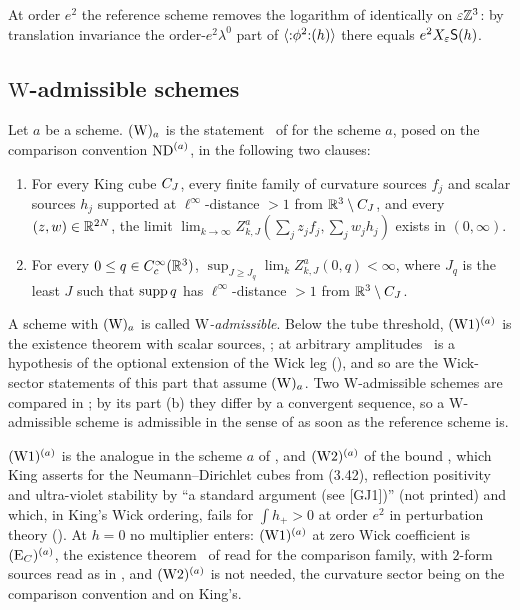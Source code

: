 At order $e^2$ the reference scheme removes the logarithm of  identically on $\varepsilon\mathbb Z^3$: by translation invariance the order-$e^2\lambda^0$ part of $\langle{:}\phi^2{:}(h)\rangle$ there equals $e^2X_{\varepsilon}\mathsf S(h)$.

\subsection{$\mathrm W$-admissible schemes}

\begin{definition}\label{rot:hyp:adm}
Let $a$ be a scheme. $(\mathrm W)_{a}$ is the statement \Wtwo\ of  for the scheme $a$, posed on the comparison convention $\mathrm{ND}^{(a)}$, in the following two clauses:
\begin{enumerate}[leftmargin=*]
\item[$\Wone^{(a)}$] For every King cube $C_J$, every finite family of curvature sources $f_j$ and scalar sources $h_j$ supported at $\ell^\infty$-distance $>1$ from $\mathbb R^3\setminus C_J$, and every $(z,w)\in\mathbb R^{2N}$, the limit $\lim_{k\to\infty}Z^a_{k,J}(\sum_jz_jf_j,\sum_jw_jh_j)$ exists in $(0,\infty)$.
\item[$\Wtwo^{(a)}$] For every $0\le q\in C^\infty_c(\mathbb R^3)$, $\sup_{J\ge J_q}\lim_kZ^a_{k,J}(0,q)<\infty$, where $J_q$ is the least $J$ such that $\operatorname{supp} q$ has $\ell^\infty$-distance $>1$ from $\mathbb R^3\setminus C_J$.
\end{enumerate}
A scheme with $(\mathrm W)_{a}$ is called \emph{$\mathrm W$-admissible}. Below the tube threshold, $\Wone^{(a)}$ is the existence theorem with scalar sources, ; at arbitrary amplitudes \Wtwo\ is a hypothesis of the optional extension of the Wick leg (), and so are the Wick-sector statements of this part that assume $(\mathrm W)_{a}$. Two $\mathrm W$-admissible schemes are compared in ; by its part (b) they differ by a convergent sequence, so a $\mathrm W$-admissible scheme is admissible in the sense of  as soon as the reference scheme is.
\end{definition}

$\Wone^{(a)}$ is the analogue in the scheme $a$ of \cite[Thm.~2.1]{K2}, and $\Wtwo^{(a)}$ of the bound \cite[(3.43)]{K2}, which King asserts for the Neumann--Dirichlet cubes from (3.42), reflection positivity and ultra-violet stability by ``a standard argument (see [GJ1])'' (not printed) and which, in King's Wick ordering, fails for $\int h_+>0$ at order $e^2$ in perturbation theory (). At $h=0$ no multiplier enters: $\Wone^{(a)}$ at zero Wick coefficient is $(\mathrm{E}_{C})^{(a)}$, the existence theorem \EC\ of  read for the comparison family, with $2$-form sources read as in , and $\Wtwo^{(a)}$ is not needed, the curvature sector being  on the comparison convention and  on King's.

